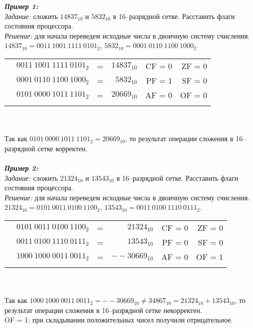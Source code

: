 \emph{\textbf{Пример 1:}}
\\\emph{Задание:} сложить $14837_{10}$ и $5832_{10}$ в 16--разрядной сетке. Расставить флаги состояния процессора.
\\\emph{Решение:} для начала переведем исходные числа в двоичную систему счисления. $14837_{10} = 0011\ 1001\ 1111\ 0101_{2}$, $5832_{10} = 0001\ 0110\ 1100\ 1000_{2}$.
\\
\begin{minipage}[c]{10cm}
\begin{tabular}{r l c r | r r |}
\\
\hhline{~~~~----}
\multirow{2}{*}{+} & $0011\ 1001\ 1111\ 0101_{2}$ & = & $14837_{10}$ & CF = 0 & ZF = 0
\\ & $0001\ 0110\ 1100\ 1000_{2}$ & = & $5832_{10}$ &  PF = 1 & SF = 0
\\ \hhline{~--~~~}
 & $0101\ 0000\ 1011\ 1101_{2}$ & = & $20669_{10}$ & AF = 0 & OF = 0
\\\hhline{~~~~----}
\end{tabular}
\end{minipage}
\\
\\Так как $0101\ 0000\ 1011\ 1101_{2} = 20669_{10}$, то результат операции сложения в 16--разрядной сетке корректен.
\\
\\\emph{\textbf{Пример 2:}}
\\\emph{Задание:} сложить $21324_{10}$ и $13543_{10}$ в 16--разрядной сетке. Расставить флаги состояния процессора.
\\\emph{Решение:} для начала переведем исходные числа в двоичную систему счисления. $21324_{10} = 0101\ 0011\ 0100\ 1100_{2}$, $13543_{10} = 0011\ 0100\ 1110\ 0111_{2}$.
\\
\begin{minipage}[c]{10cm}
\begin{tabular}{r l c r | r r |}
\\
\hhline{~~~~----}
\multirow{2}{*}{+} & $0101\ 0011\ 0100\ 1100_{2}$ & = & $21324_{10}$ & CF = 0 & ZF = 0
\\ & $0011\ 0100\ 1110\ 0111_{2}$ & = & $13543_{10}$ &  PF = 0 & SF = 0
\\ \hhline{~--~~~}
 & $1000\ 1000\ 0011\ 0011_{2}$ & = & $--30669_{10}$ & AF = 0 & OF = 1
\\\hhline{~~~~----}
\end{tabular}
\end{minipage}
\\
\\Так как $1000\ 1000\ 0011\ 0011_{2} = --30669_{10} \ne 34867_{10} = 21324_{10} + 13543_{10}$, то результат операции сложения в 16--разрядной сетке некорректен. \\OF = 1: при складывании положительных чисел получили отрицательное.
